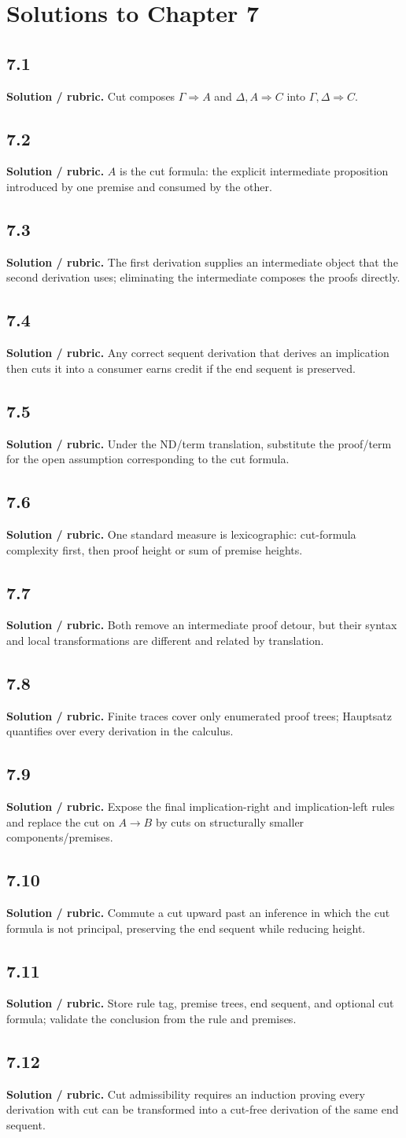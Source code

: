 \documentclass[11pt,openany]{book}
\newcommand{\sol}[2]{\section*{#1}\textbf{Solution / rubric.} #2}
\begin{document}
\chapter{Solutions to Chapter 7}
\sol{7.1}{Cut composes $\Gamma\Rightarrow A$ and $\Delta,A\Rightarrow C$ into $\Gamma,\Delta\Rightarrow C$.}
\sol{7.2}{$A$ is the cut formula: the explicit intermediate proposition introduced by one premise and consumed by the other.}
\sol{7.3}{The first derivation supplies an intermediate object that the second derivation uses; eliminating the intermediate composes the proofs directly.}
\sol{7.4}{Any correct sequent derivation that derives an implication then cuts it into a consumer earns credit if the end sequent is preserved.}
\sol{7.5}{Under the ND/term translation, substitute the proof/term for the open assumption corresponding to the cut formula.}
\sol{7.6}{One standard measure is lexicographic: cut-formula complexity first, then proof height or sum of premise heights.}
\sol{7.7}{Both remove an intermediate proof detour, but their syntax and local transformations are different and related by translation.}
\sol{7.8}{Finite traces cover only enumerated proof trees; Hauptsatz quantifies over every derivation in the calculus.}
\sol{7.9}{Expose the final implication-right and implication-left rules and replace the cut on $A\to B$ by cuts on structurally smaller components/premises.}
\sol{7.10}{Commute a cut upward past an inference in which the cut formula is not principal, preserving the end sequent while reducing height.}
\sol{7.11}{Store rule tag, premise trees, end sequent, and optional cut formula; validate the conclusion from the rule and premises.}
\sol{7.12}{Cut admissibility requires an induction proving every derivation with cut can be transformed into a cut-free derivation of the same end sequent.}
\end{document}
